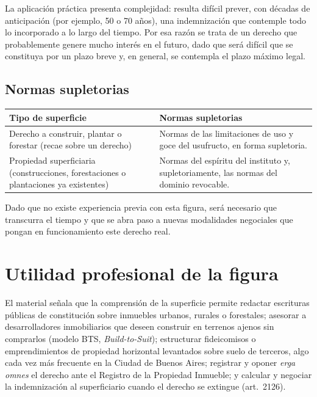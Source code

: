 \documentclass[12pt,oneside]{book}
\begin{document}
La aplicación práctica presenta complejidad: resulta difícil prever, con décadas de anticipación (por ejemplo, 50 o 70 años), una indemnización que contemple todo lo incorporado a lo largo del tiempo. Por esa razón se trata de un derecho que probablemente genere mucho interés en el futuro, dado que será difícil que se constituya por un plazo breve y, en general, se contempla el plazo máximo legal.

\subsection{Normas supletorias}

\begin{table}[H]
\centering
\begin{tabularx}{\textwidth}{@{}>{\raggedright\arraybackslash}p{}>{\raggedright\arraybackslash}X@{}}
\toprule
\textbf{Tipo de superficie} & \textbf{Normas supletorias} \\
\midrule
Derecho a construir, plantar o forestar (recae sobre un derecho) & Normas de las limitaciones de uso y goce del usufructo, en forma supletoria. \\
Propiedad superficiaria (construcciones, forestaciones o plantaciones ya existentes) & Normas del espíritu del instituto y, supletoriamente, las normas del dominio revocable. \\
\bottomrule
\end{tabularx}
\end{table}

\begin{nota}
Dado que no existe experiencia previa con esta figura, será necesario que transcurra el tiempo y que se abra paso a nuevas modalidades negociales que pongan en funcionamiento este derecho real.
\end{nota}

\section{Utilidad profesional de la figura}

El material señala que la comprensión de la superficie permite redactar escrituras públicas de constitución sobre inmuebles urbanos, rurales o forestales; asesorar a desarrolladores inmobiliarios que deseen construir en terrenos ajenos sin comprarlos (modelo BTS, \textit{Build-to-Suit}); estructurar fideicomisos o emprendimientos de propiedad horizontal levantados sobre suelo de terceros, algo cada vez más frecuente en la Ciudad de Buenos Aires; registrar y oponer \textit{erga omnes} el derecho ante el Registro de la Propiedad Inmueble; y calcular y negociar la indemnización al superficiario cuando el derecho se extingue (art.~2126).
\end{document}

